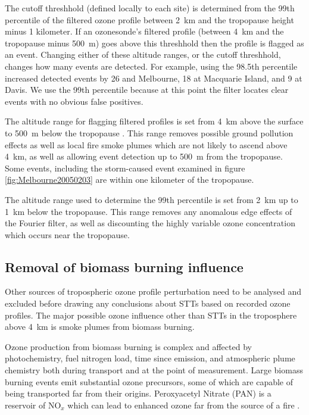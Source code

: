 \documentclass{article}
\begin{document}
    The cutoff threshhold (defined locally to each site) is determined from the 99th percentile of the filtered ozone profile between 2~km and the tropopause height minus 1 kilometer.
    If an ozonesonde's filtered profile (between 4~km and the tropopause minus 500~m) goes above this threshhold then the profile is flagged as an event.
    Changing either of these altitude ranges, or the cutoff threshhold, changes how many events are detected.
    For example, using the 98.5th percentile increased detected events by 26 and Melbourne, 18 at Macquarie Island, and 9 at Davis.
    We use the 99th percentile because at this point the filter locates clear events with no obvious false positives.
    
    The altitude range for flagging filtered profiles is set from 4~km above the surface to 500~m below the tropopause .
    This range removes possible ground pollution effects as well as local fire smoke plumes which are not likely to ascend above 4~km, as well as allowing event detection up to 500~m from the tropopause.
    Some events, including the storm-caused event examined in figure \ref{fig:Melbourne20050203} are within one kilometer of the tropopause. 
    
    The altitude range used to determine the 99th percentile is set from 2~km up to 1~km below the tropopause.
    This range removes any anomalous edge effects of the Fourier filter, as well as discounting the highly variable ozone concentration which occurs near the tropopause.
    
  \subsection{Removal of biomass burning influence}
    
    Other sources of tropospheric ozone profile perturbation need to be analysed and excluded before drawing any conclusions about STTs based on recorded ozone profiles. 
    The major possible ozone influence other than STTs in the troposphere above 4~km is smoke plumes from biomass burning.
    
    Ozone production from biomass burning is complex and affected by photochemistry, fuel nitrogen load, time since emission, and atmospheric plume chemistry both during transport and at the point of measurement.
    Large biomass burning events emit substantial ozone precursors, some of which are capable of being transported far from their origins. 
    Peroxyacetyl Nitrate (PAN) is a reservoir of NO$_x$ which can lead to enhanced ozone far from the source of a fire \citep{Jaffe_2012}.
    
\end{document}
